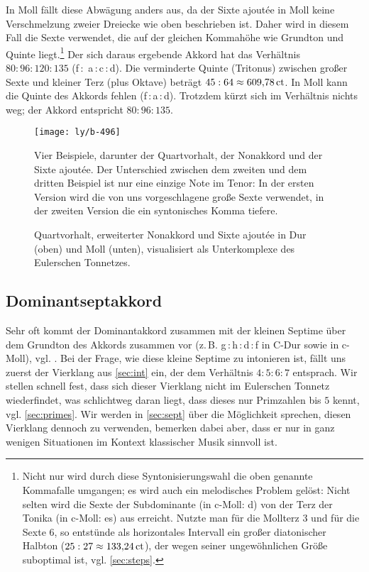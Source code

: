 In Moll fällt diese Abwägung anders aus, da der Sixte ajoutée in Moll keine
Verschmelzung zweier Dreiecke wie oben beschrieben ist.  Daher wird in diesem
Fall die Sexte verwendet, die auf der gleichen Kommahöhe wie Grundton und Quinte
liegt.\footnote{Nicht nur wird durch diese Syntonisierungswahl die oben genannte
  Kommafalle umgangen; es wird auch ein melodisches Problem gelöst: Nicht selten
  wird die Sexte der Subdominante (in c-Moll: d) von der Terz der Tonika (in
  c-Moll: es) aus erreicht.  Nutzte man für die Mollterz \flatp $3$ und für die
  Sexte \naturalp $6$, so entstünde als horizontales Intervall ein großer
  diatonischer Halbton ($25:27\approx 133{,}24\,\text{ct}$), der wegen seiner
  ungewöhnlichen Größe suboptimal ist, vgl. \cref{sec:steps}.} Der sich daraus
ergebende Akkord hat das Verhältnis $80:96:120:135$ (f\,:\,\flatp
a\,:\,c\,:\,d).  Die verminderte Quinte (Tritonus) zwischen großer Sexte und
kleiner Terz (plus Oktave) beträgt $45:64\approx 609{,}78\,\text{ct}$.  In Moll kann die
Quinte des Akkords fehlen (f\,:\,\flatp a\,:\,d). Trotzdem kürzt sich im
Verhältnis nichts weg; der Akkord entspricht $80:96:135$.


\begin{figure}
  \centering
  \texttt{[image: ly/b-496]}
  \caption{Vier Beispiele, darunter der Quartvorhalt, der Nonakkord und der
    Sixte ajoutée. Der Unterschied zwischen dem zweiten und dem dritten Beispiel
    ist nur eine einzige Note im Tenor: In der ersten Version wird die von uns
    vorgeschlagene große Sexte verwendet, in der zweiten Version die ein
    syntonisches Komma tiefere.}\label{fig:496}
\end{figure}

\begin{figure}
  \centering
  
  \caption{Quartvorhalt, erweiterter Nonakkord und Sixte ajoutée in Dur (oben)
    und Moll (unten), visualisiert als Unterkomplexe des Eulerschen
    Tonnetzes.}\label{fig:chordLines}
\end{figure}

\subsection{Dominantseptakkord}
\label{sec:dom7syn}

Sehr oft kommt der Dominantakkord zusammen mit der kleinen Septime über dem
Grundton des Akkords zusammen vor (z.\,B. g\,:\,h\,:\,d\,:\,f in C-Dur sowie in
c-Moll), vgl. \cite[{}9.1]{Skript}.  Bei der Frage, wie diese kleine Septime zu
intonieren ist, fällt uns zuerst der Vierklang aus \cref{sec:int} ein, der dem
Verhältnis $4:5:6:7$ entsprach. Wir stellen schnell fest, dass sich dieser
Vierklang nicht im Eulerschen Tonnetz wiederfindet, was schlichtweg daran liegt,
dass dieses nur Primzahlen bis $5$ kennt, vgl. \cref{sec:primes}.  Wir werden in
\cref{sec:sept} über die Möglichkeit sprechen, diesen Vierklang dennoch zu
verwenden, bemerken dabei aber, dass er nur in ganz wenigen Situationen im
Kontext klassischer Musik sinnvoll ist.

